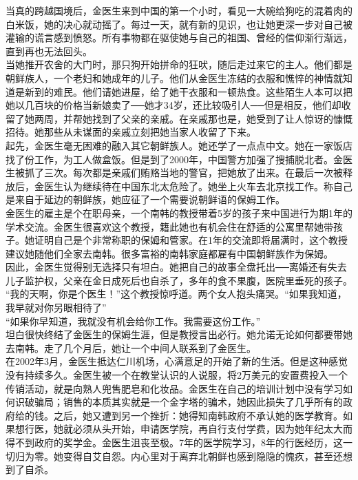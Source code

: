 当真的跨越国境后，金医生来到中国的第一个小时，看见一大碗给狗吃的混着肉的白米饭，她的决心就动摇了。每过一天，就有新的见识，也让她更深一步对自己被灌输的谎言感到愤怒。所有事物都在驱使她与自己的祖国、曾经的信仰渐行渐远，直到再也无法回头。\\

当她推开农舍的大门时，那只狗开始拼命的狂吠，随后走过来它的主人。他们都是朝鲜族人，一个老妇和她成年的儿子。他们从金医生冻结的衣服和憔悴的神情就知道是新到的难民。他们请她进屋，给了她干衣服和一顿热食。这些陌生人本可以把她以几百块的价格当新娘卖了──她才34岁，还比较吸引人──但是相反，他们却收留了她两周，并帮她找到了父亲的亲戚。在亲戚那也是，她受到了让人惊讶的慷慨招待。她那些从未谋面的亲戚立刻把她当家人收留了下来。\\

起先，金医生毫无困难的融入其它朝鲜族人。她还学了一点点中文。她在一家饭店找了份工作，为工人做盒饭。但是到了2000年，中国警方加强了搜捕脱北者。金医生被抓了三次。每次都是亲戚们贿赂当地的警官，把她放了出来。在最后一次被释放后，金医生认为继续待在中国东北太危险了。她坐上火车去北京找工作。称自己是来自于延边的朝鲜族，她应征了一个需要说朝鲜语的保姆工作。\\

金医生的雇主是个在职母亲，一个南韩的教授带着5岁的孩子来中国进行为期1年的学术交流。金医生很喜欢这个教授，籍此她也有机会住在舒适的公寓里帮她带孩子。她证明自己是个非常称职的保姆和管家。在1年的交流即将届满时，这个教授建议她随他们全家去南韩。很多富裕的南韩家庭都雇有中国朝鲜族作为保姆。\\

因此，金医生觉得别无选择只有坦白。她把自己的故事全盘托出──离婚还有失去儿子监护权，父亲在金日成死后也自杀了，多年的食不果腹，医院里垂死的孩子。\\

“我的天啊，你是个医生！”这个教授惊呼道。两个女人抱头痛哭。“如果我知道，我早就对你另眼相待了”\\

“如果你早知道，我就没有机会给你工作。我需要这份工作。”\\

坦白很快终结了金医生的保姆生涯，但是教授言出必行。她允诺无论如何都要带她去南韩。走了几个月后，她让一个中间人联系到了金医生。\\

在2002年3月，金医生抵达仁川机场，心满意足的开始了新的生活。但是这种感觉没有持续多久。金医生被一个在教堂认识的人说服，将2万美元的安置费投入一个传销活动，就是向熟人兜售肥皂和化妆品。金医生在自己的培训计划中没有学习如何识破骗局；销售的本质其实就是一个金字塔的骗术，她因此损失了几乎所有的政府给的钱。之后，她又遭到另一个挫折：她得知南韩政府不承认她的医学教育。如果想行医，她就必须从头开始，申请医学院，再自行支付学费，因为她年纪太大而得不到政府的奖学金。金医生沮丧至极。7年的医学院学习，8年的行医经历，这一切归为零。她变得自艾自怨。内心里对于离弃北朝鲜也感到隐隐的愧疚，甚至还想到了自杀。\\

